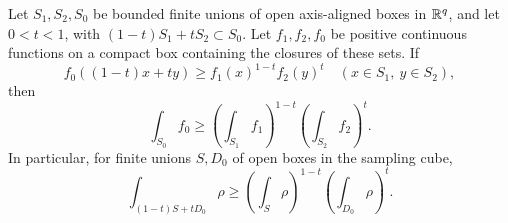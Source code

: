 \begin{lemma}\label{lem:integral-interpolation}
Let $S_1,S_2,S_0$ be bounded finite unions of open axis-aligned boxes in
$\mathbb{R}^q$, and let $0<t<1$, with
$(1-t)S_1+tS_2\subset S_0$.  Let $f_1,f_2,f_0$ be positive continuous
functions on a compact box containing the closures of these sets.
If
\[
 f_0((1-t)x+ty)\ge f_1(x)^{1-t}f_2(y)^t
 \quad(x\in S_1,\ y\in S_2),
\]
then
\begin{equation}\label{eq:integral-interpolation}
 \int_{S_0}f_0\ge
       \left(\int_{S_1}f_1\right)^{1-t}
       \left(\int_{S_2}f_2\right)^t.
\end{equation}
In particular, for finite unions $S,D_0$ of open boxes in the sampling
cube,
\begin{equation}\label{eq:dense-logconcave-interpolation}
 \int_{(1-t)S+tD_0}\rho\ge
       \left(\int_S\rho\right)^{1-t}
       \left(\int_{D_0}\rho\right)^t.
\end{equation}
\end{lemma}

